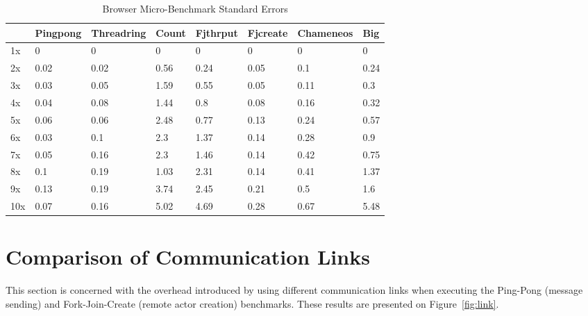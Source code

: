 \documentclass[oneside]{um-fict}
\begin{document}
\begin{table}[H]
    \begin{center}
        \begin{tabular}{|l|lllllll|}
        \hline
        & Pingpong & Threadring & Count & Fjthrput & Fjcreate & Chameneos & Big  \\ \hline
        1x  & 0        & 0          & 0     & 0        & 0        & 0         & 0    \\
        2x  & 0.02     & 0.02       & 0.56  & 0.24     & 0.05     & 0.1       & 0.24 \\
        3x  & 0.03     & 0.05       & 1.59  & 0.55     & 0.05     & 0.11      & 0.3  \\
        4x  & 0.04     & 0.08       & 1.44  & 0.8      & 0.08     & 0.16      & 0.32 \\
        5x  & 0.06     & 0.06       & 2.48  & 0.77     & 0.13     & 0.24      & 0.57 \\
        6x  & 0.03     & 0.1        & 2.3   & 1.37     & 0.14     & 0.28      & 0.9  \\
        7x  & 0.05     & 0.16       & 2.3   & 1.46     & 0.14     & 0.42      & 0.75 \\
        8x  & 0.1      & 0.19       & 1.03  & 2.31     & 0.14     & 0.41      & 1.37 \\
        9x  & 0.13     & 0.19       & 3.74  & 2.45     & 0.21     & 0.5       & 1.6  \\
        10x & 0.07     & 0.16       & 5.02  & 4.69     & 0.28     & 0.67      & 5.48 \\ \hline
        \end{tabular}
        \caption{Browser Micro-Benchmark Standard Errors}\label{tab:browserloadscalingsem}
    \end{center}
\end{table}
\section{Comparison of Communication Links}
This section is concerned with the overhead introduced by using different communication links when executing the Ping-Pong (message sending) and Fork-Join-Create (remote actor creation) benchmarks. These results are presented on Figure~\ref{fig:link}.
\end{document}
